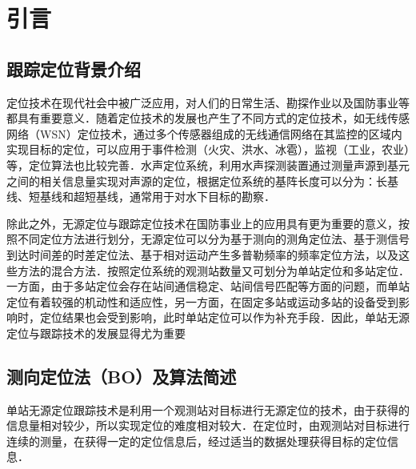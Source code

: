 %
%
%
%
%
%

\chapter{引言}

\section{跟踪定位背景介绍}
定位技术在现代社会中被广泛应用，对人们的日常生活、勘探作业以及国防事业等都具有重要意义．随着定位技术的发展也产生了不同方式的定位技术，如无线传感网络（WSN）定位技术\cite{wls1}\cite{wls2}\cite{wsl3}\cite{wsl4}，通过多个传感器组成的无线通信网络在其监控的区域内实现目标的定位，可以应用于事件检测（火灾、洪水、冰雹），监视（工业，农业）等，定位算法也比较完善．水声定位系统\cite{bls5}\cite{bls6}\cite{bls7}\cite{bls8}，利用水声探测装置通过测量声源到基元之间的相关信息量实现对声源的定位，根据定位系统的基阵长度可以分为：长基线、短基线和超短基线，通常用于对水下目标的勘察．

除此之外，无源定位与跟踪定位技术在国防事业上的应用具有更为重要的意义\cite{9}，按照不同定位方法进行划分，无源定位可以分为基于测向的测角定位法、基于测信号到达时间差的时差定位法、基于相对运动产生多普勒频率的频率定位方法，以及这些方法的混合方法．按照定位系统的观测站数量又可划分为单站定位和多站定位．一方面，由于多站定位会存在站间通信稳定、站间信号匹配等方面的问题，而单站定位有着较强的机动性和适应性，另一方面，在固定多站或运动多站的设备受到影响时，定位结果也会受到影响，此时单站定位可以作为补充手段．因此，单站无源定位与跟踪技术的发展显得尤为重要
\section{测向定位法（BO）及算法简述}
单站无源定位跟踪技术是利用一个观测站对目标进行无源定位的技术，由于获得的信息量相对较少，所以实现定位的难度相对较大．在定位时，由观测站对目标进行连续的测量，在获得一定的定位信息后，经过适当的数据处理获得目标的定位信息．


